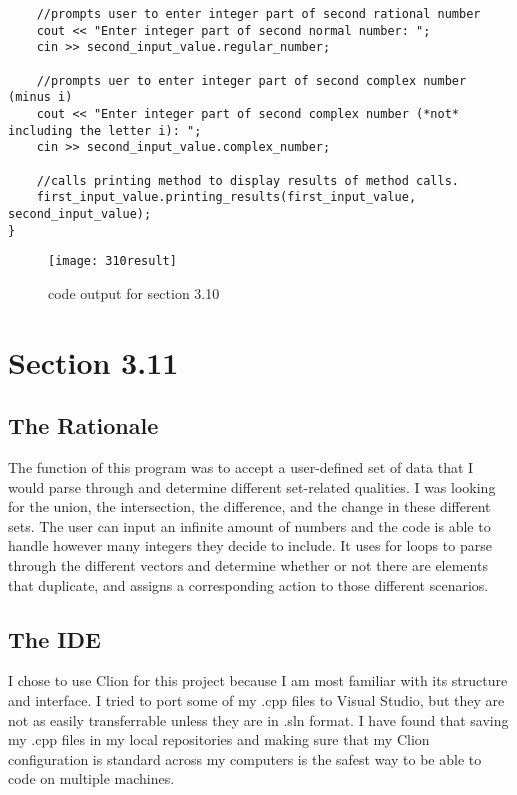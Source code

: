 \documentclass[11pt]{article}
\begin{document}
\begin{lstlisting}
    //prompts user to enter integer part of second rational number
    cout << "Enter integer part of second normal number: ";
    cin >> second_input_value.regular_number;

    //prompts uer to enter integer part of second complex number (minus i)
    cout << "Enter integer part of second complex number (*not* including the letter i): ";
    cin >> second_input_value.complex_number;

    //calls printing method to display results of method calls.
    first_input_value.printing_results(first_input_value, second_input_value);
}

\end{lstlisting}

\begin{figure}[h]
    \centering
    \texttt{[image: 310result]}
    \caption{code output for section 3.10}
    \label{fig:my_label}
\end{figure}

\section*{Section 3.11}
\subsection*{The Rationale}
The function of this program was to accept a user-defined set of data that I would parse through and determine different set-related qualities. I was looking for the union, the intersection, the difference, and the change in these different sets. The user can input an infinite amount of numbers and the code is able to handle however many integers they decide to include. It uses for loops to parse through the different vectors and determine whether or not there are elements that duplicate, and assigns a corresponding action to those different scenarios. 

\subsection*{The IDE}
I chose to use Clion for this project because I am most familiar with its structure and interface. I tried to port some of my .cpp files to Visual Studio, but they are not as easily transferrable unless they are in .sln format. I have found that saving my .cpp files in my local repositories and making sure that my Clion configuration is standard across my computers is the safest way to be able to code on multiple machines.
\end{document}
